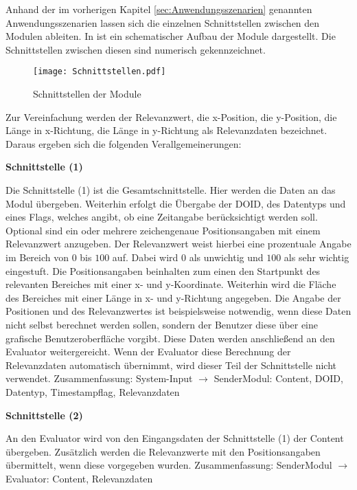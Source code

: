 Anhand der im vorherigen Kapitel \ref{sec:Anwendungsszenarien} genannten
Anwendungsszenarien lassen sich die einzelnen Schnittstellen zwischen den
Modulen ableiten. In  ist ein schematischer Aufbau
der Module dargestellt. Die Schnittstellen zwischen diesen sind numerisch
gekennzeichnet.

\begin{figure}[H]
\centering
\texttt{[image: Schnittstellen.pdf]}
\caption{Schnittstellen der Module}
\label{fig:Schnittstellen}
\end{figure}

Zur Vereinfachung werden der Relevanzwert, die x-Position, die
y-Position, die Länge in x-Richtung, die Länge in y-Richtung als Relevanzdaten
bezeichnet. Daraus ergeben sich die folgenden Verallgemeinerungen:

\textbf{Schnittstelle (1)}

Die Schnittstelle (1) ist die Gesamtschnittstelle. Hier werden die
Daten an das Modul übergeben. Weiterhin erfolgt die Übergabe der \gls{DOID}, des
Datentyps und eines Flags, welches angibt, ob eine Zeitangabe berücksichtigt
werden soll.
Optional sind ein oder mehrere zeichengenaue Positionsangaben mit einem
Relevanzwert anzugeben. Der Relevanzwert weist hierbei eine prozentuale Angabe
im Bereich von $0$ bis $100$ auf. Dabei wird $0$ als unwichtig und $100$ als
sehr wichtig eingestuft. Die Positionsangaben beinhalten zum einen den
Startpunkt des relevanten Bereiches mit einer x- und y-Koordinate. Weiterhin
wird die Fläche des Bereiches mit einer Länge in x- und y-Richtung angegeben.
Die Angabe der Positionen und des Relevanzwertes ist beispielsweise notwendig,
wenn diese Daten nicht selbst berechnet werden sollen, sondern der Benutzer
diese über eine grafische Benutzeroberfläche vorgibt. Diese Daten werden
anschließend an den Evaluator weitergereicht. Wenn der Evaluator diese
Berechnung der Relevanzdaten automatisch übernimmt, wird dieser Teil der
Schnittstelle nicht verwendet.
\newline 
Zusammenfassung: System-Input $\rightarrow$ SenderModul: Content, \gls{DOID},
Datentyp, Timestampflag, Relevanzdaten

\textbf{Schnittstelle (2)}

An den Evaluator wird von den Eingangsdaten der Schnittstelle (1)
der Content übergeben. Zusätzlich werden die Relevanzwerte mit den
Positionsangaben übermittelt, wenn diese vorgegeben wurden.\newline
Zusammenfassung: SenderModul $\rightarrow$ Evaluator: Content, Relevanzdaten  

